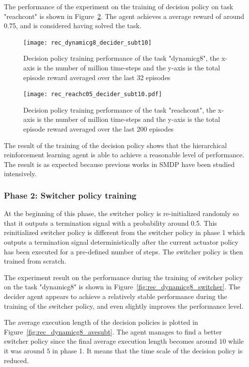 The performance of the experiment on the training of decision policy on task "reachcont" is shown in Figure~\ref{fig:rec_reachc05_decider_subt10}. The agent achieves a average reward of around 0.75, and is considered having solved the task.


\begin{figure}[!htbp]
\centering
\texttt{[image: rec\_dynamicg8\_decider\_subt10]}
\caption{Decision policy training performance of the task "dynamicg8", the x-axis is the number of million time-steps and the y-axis is the total episode reward averaged over the last 32 episodes}
\label{fig:rec_dynamicg8_decider_subt10}
\end{figure}


\begin{figure}
\centering
\texttt{[image: rec\_reachc05\_decider\_subt10.pdf]}
\caption{Decision policy training performance of the task "reachcont", the x-axis is the number of million time-steps and the y-axis is the total episode reward averaged over the last 200 episodes}
\label{fig:rec_reachc05_decider_subt10}
\end{figure}

The result of the training of the decision policy shows that the hierarchical reinforcement learning agent is able to achieve a reasonable level of performance. The result is as expected because previous works in SMDP have been studied intensively.

\subsubsection{Phase 2: Switcher policy training}
At the beginning of this phase, the switcher policy is re-initialized randomly so that it outputs a termination signal with a probability around 0.5. This reinitialized switcher policy is different from the switcher policy in phase 1 which outputs a termination signal deterministically after the current actuator policy has been executed for a pre-defined number of steps. The switcher policy is then trained from scratch.

The experiment result on the performance during the training of switcher policy on the task "dynamicg8" is shown in Figure~\ref{fig:rec_dynamicg8_switcher}. The decider agent appears to achieve a relatively stable performance during the training of the switcher policy, and even slightly improves the performance level.

The average execution length of the decision policies is plotted in Figure~\ref{fig:rec_dynamicg8_avesubt}. The agent manages to find a better switcher policy since the final average execution length becomes around $10$ while it was around $5$ in phase 1. It means that the time scale of the decision policy is reduced.

